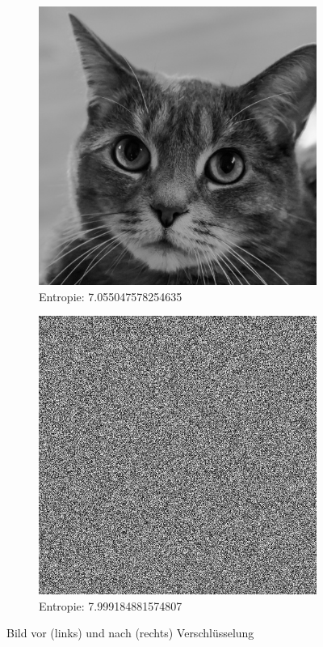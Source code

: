 \begin{figure}
	\centering

	\begin{subfigure}{0.4\textwidth}
		\includegraphics[width=\textwidth]{3/gray_7.055047578254635_cat.jpg}
		\caption{Entropie: 7.055047578254635}
		\label{figcat:first}
	\end{subfigure}
	\hfill
	\begin{subfigure}{0.4\textwidth}
		\includegraphics[width=\textwidth]{../1/3/encrypted_7.999184881574807_cat.jpg}
		\caption{Entropie: 7.999184881574807}
		\label{figcat:second}
	\end{subfigure}

	\caption{Bild vor (links) und nach (rechts) Verschlüsselung}\label{fig:}
\end{figure}






